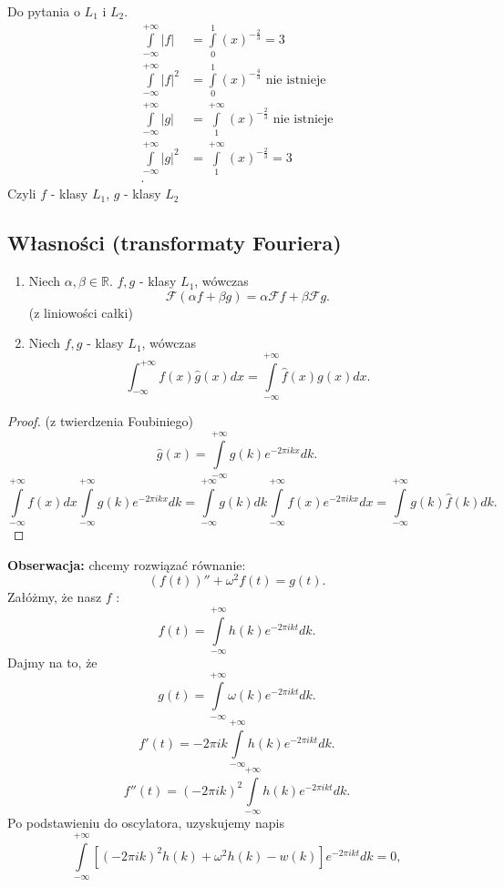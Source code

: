 \documentclass[../main.tex]{subfiles}
\begin{document}
Do pytania o $L_1$ i $L_2$.
\begin{align*}
    \int\limits_{-\infty}^{+\infty} |f| &= \int\limits_{0}^1 (x)^{-\frac{2}{3}} = 3\\
    \int\limits_{-\infty}^{+\infty} |f|^2 &= \int\limits_{0}^{1} (x)^{-\frac{4}{3}} \text{ nie istnieje}\\
    \int\limits_{-\infty}^{+\infty} |g| &=\int\limits_1^{+\infty} (x)^{-\frac{2}{3}} \text{ nie istnieje}\\
    \int\limits_{-\infty}^{+\infty} |g|^2 &= \int\limits_{1}^{+\infty} (x)^{-\frac{2}{3}} = 3\\
.\end{align*}
Czyli $f$ - klasy $L_1$, $g$ - klasy $L_2$
\subsection{Własności (transformaty Fouriera)}
\begin{enumerate}
    \item Niech $\alpha, \beta\in\mathbb{R}$. $f,g$ - klasy $L_1$, wówczas
        \[
            \mathcal{F}(\alpha f + \beta g) = \alpha \mathcal{F} f + \beta \mathcal{F} g
        .\]
    (z liniowości całki)
\item Niech $f,g$ - klasy $L_1$, wówczas
    \[
        \int_{-\infty}^{+\infty}f(x) \hat{g}(x) dx = \int\limits_{-\infty}^{+\infty}\hat{f}(x)g(x)dx
    .\]
\end{enumerate}
\begin{proof}
    (z twierdzenia Foubiniego)
\[
    \hat{g}(x) = \int\limits_{-\infty}^{+\infty}g(k) e^{-2\pi i kx}dk
.\]
\[
    \int\limits_{-\infty}^{+\infty}f(x)dx \int\limits_{-\infty}^{+\infty}g(k)e^{-2\pi i kx}dk = \int\limits_{-\infty}^{+\infty}g(k)dk \int\limits_{-\infty}^{+\infty}f(x) e^{-2\pi i kx}dx = \int\limits_{-\infty}^{+\infty}g(k)\hat{f}(k)dk
.\]
\end{proof}
\textbf{Obserwacja:} chcemy rozwiązać równanie:
\[
    \left( f(t) \right)'' + \omega^2 f(t) = g(t)
.\]
Załóżmy, że nasz $f$ :
        \[ f(t) = \int\limits_{-\infty}^{+\infty} h(k) e^{-2\pi i kt}dk
        .\]
        Dajmy na to, że
\[
    g(t) = \int\limits_{-\infty}^{+\infty}\omega(k)e^{-2\pi ik t}dk
.\]
\[
    f'(t) = -2\pi ik \int\limits_{-\infty}^{+\infty}h(k)e^{-2\pi i k t}dk
.\]
\[
    f''(t) = (-2\pi i k)^2 \int\limits_{-\infty}^{+\infty}h(k)e^{-2\pi i k t}dk
.\]
Po podstawieniu do oscylatora, uzyskujemy napis
\[
    \int\limits_{-\infty}^{+\infty}\left[(-2\pi i k)^2 h(k) + \omega^2 h(k) - w(k)\right]e^{-2\pi i k t}dk = 0
,\]
\end{document}
